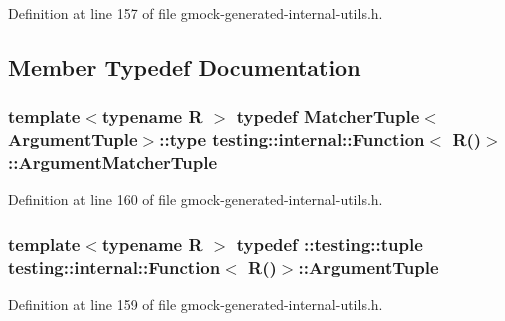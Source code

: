 Definition at line 157 of file gmock-\/generated-\/internal-\/utils.\+h.



\subsection{Member Typedef Documentation}
\subsubsection[{\texorpdfstring{Argument\+Matcher\+Tuple}{ArgumentMatcherTuple}}]{\setlength{\rightskip}{0pt plus 5cm}template$<$typename R $>$ typedef {\bf Matcher\+Tuple}$<${\bf Argument\+Tuple}$>$\+::type {\bf testing\+::internal\+::\+Function}$<$ {\bf R}()$>$\+::{\bf Argument\+Matcher\+Tuple}}\hypertarget{structtesting_1_1internal_1_1_function_3_01_r_07_08_4_a9bec5cf8937e8af99dedab2f40129fab}{}\label{structtesting_1_1internal_1_1_function_3_01_r_07_08_4_a9bec5cf8937e8af99dedab2f40129fab}


Definition at line 160 of file gmock-\/generated-\/internal-\/utils.\+h.

\subsubsection[{\texorpdfstring{Argument\+Tuple}{ArgumentTuple}}]{\setlength{\rightskip}{0pt plus 5cm}template$<$typename R $>$ typedef \+::testing\+::tuple {\bf testing\+::internal\+::\+Function}$<$ {\bf R}()$>$\+::{\bf Argument\+Tuple}}\hypertarget{structtesting_1_1internal_1_1_function_3_01_r_07_08_4_ad483c3128c470d8cdb55c3ac1c575c11}{}\label{structtesting_1_1internal_1_1_function_3_01_r_07_08_4_ad483c3128c470d8cdb55c3ac1c575c11}


Definition at line 159 of file gmock-\/generated-\/internal-\/utils.\+h.


